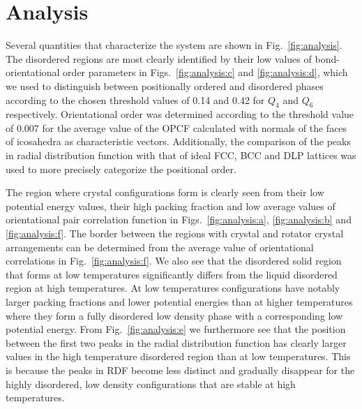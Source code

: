 \documentclass[10pt,aps,pre,twocolumn,superscriptaddress,amsmath,amssymb]{revtex4-1}
\begin{document}
\section{Analysis}

Several quantities that characterize the system are shown in Fig.~\ref{fig:analysis}.
The disordered regions are most clearly identified by their low values of bond-orientational order parameters in Figs.~\ref{fig:analysis:c} and \ref{fig:analysis:d}, which we used to distinguish between positionally ordered and disordered phases according to the chosen threshold values of 0.14 and 0.42 for $Q_4$ and $Q_6$ respectively.
Orientational order was determined according to the threshold value of 0.007 for the average value of the OPCF calculated with normals of the faces of icosahedra as characteristic vectors.
Additionally, the comparison of the peaks in radial distribution function with that of ideal FCC, BCC and DLP lattices was used to more precisely categorize the positional order.

The region where crystal configurations form is clearly seen from their low potential energy values, their high packing fraction and low average values of orientational pair correlation function in Figs.~\ref{fig:analysis:a}, \ref{fig:analysis:b} and \ref{fig:analysis:f}.
%
The border between the regions with crystal and rotator crystal arrangements can be determined from the average value of orientational correlations in Fig.~\ref{fig:analysis:f}.
%
We also see that the disordered solid region that forms at low temperatures significantly differs from the liquid disordered region at high temperatures. At low temperatures configurations have notably larger packing fractions and lower potential energies than at higher temperatures where they form a fully disordered low density phase with a corresponding low potential energy.
From Fig.~\ref{fig:analysis:e} we furthermore see that the position between the first two peaks in the radial distribution function has clearly larger values in the high temperature disordered region than at low temperatures. This is because the peaks in RDF become less distinct and gradually disappear for the highly disordered, low density configurations that are stable at high temperatures.
\end{document}
